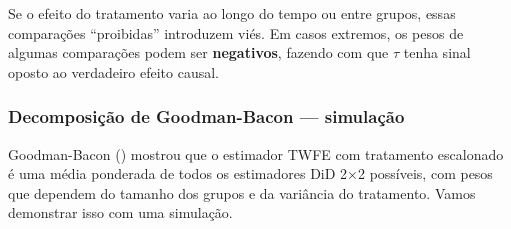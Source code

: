 \documentclass[
]{article}
\begin{document}
Se o efeito do tratamento varia ao longo do tempo ou entre grupos, essas comparações ``proibidas'' introduzem viés. Em casos extremos, os pesos de algumas comparações podem ser \textbf{negativos}, fazendo com que \(\hat{\tau}\) tenha sinal oposto ao verdadeiro efeito causal.

\subsubsection{Decomposição de Goodman-Bacon --- simulação}\label{decomposiuxe7uxe3o-de-goodman-bacon-simulauxe7uxe3o}

Goodman-Bacon () mostrou que o estimador TWFE com tratamento escalonado é uma média ponderada de todos os estimadores DiD 2×2 possíveis, com pesos que dependem do tamanho dos grupos e da variância do tratamento. Vamos demonstrar isso com uma simulação.
\end{document}
